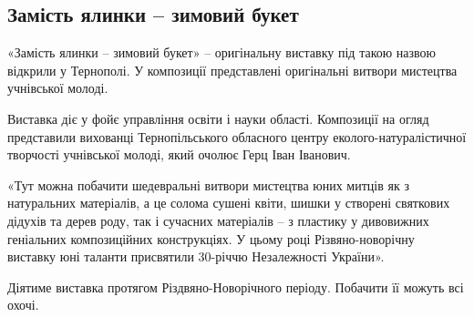  
 
 
 
 
\subsection{Замість ялинки – зимовий букет}
\label{sec:31_12_2021.stz.news.ua.zzte.1.jalynka_buket}



\begin{zznagolos}
«Замість ялинки – зимовий букет» – оригінальну виставку під такою назвою
відкрили у Тернополі. У композиції представлені оригінальні витвори мистецтва
учнівської молоді.
\end{zznagolos}

Виставка діє у фойє управління освіти і науки області. Композиції на огляд
представили вихованці Тернопільського обласного центру еколого-натуралістичної
творчості учнівської молоді, який очолює Герц Іван Іванович.

«Тут можна побачити шедевральні витвори мистецтва юних митців як з натуральних
матеріалів, а це солома сушені квіти, шишки у створені святкових дідухів та
дерев роду, так і сучасних матеріалів – з пластику у дивовижних геніальних
композиційних конструкціях. У цьому році Різвяно-новорічну виставку юні таланти
присвятили 30-річчю Незалежності України».

Діятиме виставка протягом Різдвяно-Новорічного періоду. Побачити її можуть всі
охочі.

